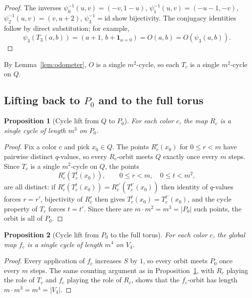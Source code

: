 \documentclass[11pt]{article}
\newtheorem{proposition}{Proposition}
\newcommand{\Pzero}{P_0}
\newcommand{\Qslice}{Q}
\newcommand{\I}{\mathbf 1}
\begin{document}
\begin{proof}
The inverses $\psi_0^{-1}(u,v)=(-v,1-u)$, $\psi_1^{-1}(u,v)=(-u-1,-v)$, $\psi_2^{-1}(u,v)=(v,u+2)$, $\psi_3^{-1}=\mathrm{id}$ show bijectivity.
The conjugacy identities follow by direct substitution; for example,
\[
\psi_3(T_3(a,b))=(a+1,\,b+\I_{a=0})=O(a,b)=O(\psi_3(a,b)).
\]
\end{proof}

By Lemma~\ref{lem:odometer}, $O$ is a single $m^2$-cycle, so each $T_c$ is a single $m^2$-cycle on $\Qslice$.

\subsection{Lifting back to \texorpdfstring{$\Pzero$}{P0} and to the full torus}\label{sec:d4-lift}

\begin{proposition}[Cycle lift from $\Qslice$ to $\Pzero$]\label{prop:d4-lift-p0}
For each color $c$, the map $R_c$ is a single cycle of length $m^3$ on $\Pzero$.
\end{proposition}

\begin{proof}
Fix a color $c$ and pick $x_0\in\Qslice$.
The points $R_c^r(x_0)$ for $0\le r<m$ have pairwise distinct $q$-values, so every $R_c$-orbit meets $\Qslice$ exactly once every $m$ steps.
Since $T_c$ is a single $m^2$-cycle on $\Qslice$, the points
\[
R_c^r(T_c^t(x_0)), \qquad 0\le r<m,\quad 0\le t<m^2,
\]
are all distinct: if $R_c^r(T_c^t(x_0))=R_c^{r'}(T_c^{t'}(x_0))$ then identity of $q$-values forces $r=r'$, bijectivity of $R_c^r$ then gives $T_c^t(x_0)=T_c^{t'}(x_0)$, and the cycle property of $T_c$ forces $t=t'$.
Since there are $m\cdot m^2=m^3=|\Pzero|$ such points, the orbit is all of $\Pzero$.
\end{proof}

\begin{proposition}[Cycle lift from $\Pzero$ to the full torus]\label{prop:d4-lift-full}
For each color $c$, the global map $f_c$ is a single cycle of length $m^4$ on $V_4$.
\end{proposition}

\begin{proof}
Every application of $f_c$ increases $S$ by $1$, so every orbit meets $\Pzero$ once every $m$ steps.
The same counting argument as in Proposition~\ref{prop:d4-lift-p0}, with $R_c$ playing the role of $T_c$ and $f_c$ playing the role of $R_c$, shows that the $f_c$-orbit has length $m\cdot m^3=m^4=|V_4|$.
\end{proof}
\end{document}
